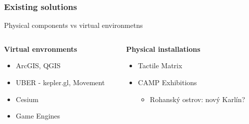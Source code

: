 \documentclass[czech,xcolor={table}]{beamer}
\begin{document}
	\begin{frame}
		\frametitle{Existing solutions}
		\begin{center}
			Physical components vs virtual environmetns
		\end{center}
		\begin{columns}[t]
			\begin{column}{0.5\textwidth}
				\textbf{Virtual envronments}
				\begin{itemize}
					\item ArcGIS, QGIS
					\item UBER - kepler.gl, Movement
					\item Cesium
					\item Game Engines
				\end{itemize}
			\end{column}
			\begin{column}{0.45\textwidth}
				\textbf{Physical installations}
				\begin{itemize}
					\item Tactile Matrix
					\item CAMP Exhibitions 
						\begin{itemize}
							\item Rohanský ostrov: nový Karlín?
						\end{itemize}
				\end{itemize}
			\end{column}
		\end{columns}
		
	\end{frame}
\end{document}
